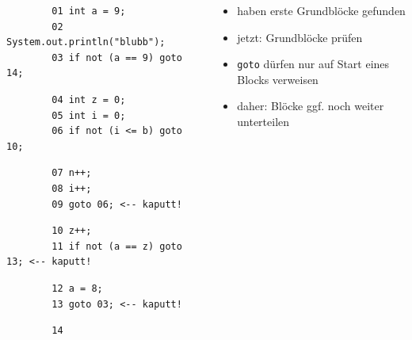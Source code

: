 \documentclass[18pt]{beamer}
\begin{document}
	\begin{frame}[fragile]
\small 
\begin{columns}
	\begin{column}{0.5\textwidth}
		\footnotesize
		\begin{verbatim}
		01 int a = 9;
		02 System.out.println("blubb");
		03 if not (a == 9) goto 14;
		\end{verbatim}
		\begin{verbatim}
		04 int z = 0;
		05 int i = 0;
		06 if not (i <= b) goto 10; 
		\end{verbatim}
		\begin{verbatim}
		07 n++;
		08 i++;
		09 goto 06; <-- kaputt!
		\end{verbatim}
		\begin{verbatim}
		10 z++;
		11 if not (a == z) goto 13; <-- kaputt!
		\end{verbatim}
		\begin{verbatim}
		12 a = 8;
		13 goto 03; <-- kaputt!
		\end{verbatim}
		\begin{verbatim}
		14
		\end{verbatim}
	\end{column}%
	\begin{column}{0.5\textwidth}
		\begin{itemize}
			\item haben erste Grundblöcke gefunden
			\item jetzt: Grundblöcke prüfen
			\item \texttt{goto} dürfen nur auf Start eines Blocks verweisen
			\item daher: Blöcke ggf. noch weiter unterteilen
		\end{itemize}
	\end{column}
\end{columns}	
\end{frame}
\end{document}
